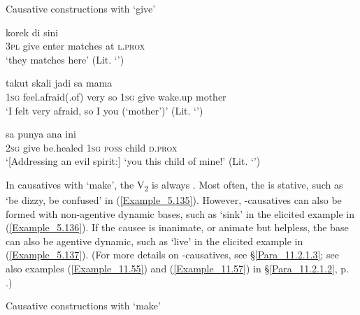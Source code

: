 \begin{styleExampleTitle}
Causative constructions with  ‘give’
\end{styleExampleTitle}

\ea
\label{Example_5.132}
 {} {} {korek} {di} {sini}\\ %
 \textsc{3pl}  give  enter  matches  at  \textsc{l.prox}\\
\glt 
‘they  matches here’ (Lit. ‘’) \textstyleExampleSource{[081025-006-Cv.0180]}
\z

\ea
\label{Example_5.133}
 {takut} {skali} {jadi} {sa} {} {} {mama}\\ %
 \textsc{1sg}  feel.afraid(.of)  very  so  \textsc{1sg}  give  wake.up  mother\\
\glt 
‘I felt very afraid, so I  you (‘mother’)’ (Lit. ‘’) \textstyleExampleSource{[080917-008-NP.0031]}
\z

\ea
\label{Example_5.134}
 {} {} {sa} {punya} {ana} {ini}\\ %
 \textsc{2sg}  give  be.healed  \textsc{1sg}  \textsc{poss}  child  \textsc{d.prox}\\
\glt 
‘[Addressing an evil spirit:] ‘you  this child of mine!’ (Lit. ‘’) \textstyleExampleSource{[081006-023-CvEx.0031]}
\z



In causatives with  ‘make’, the V\textsubscript{2} is always . Most often, the   is stative, such as  ‘be dizzy, be confused’ in (\ref{Example_5.135}). However, -causatives can also be formed with non-agentive dynamic bases, such as  ‘sink’ in the elicited example in (\ref{Example_5.136}). If the causee is inanimate, or animate but helpless, the base can also be agentive dynamic, such as  ‘live’ in the elicited example in (\ref{Example_5.137}). (For more details on -causatives, see §\ref{Para_11.2.1.3}; see also examples (\ref{Example_11.55}) and (\ref{Example_11.57}) in §\ref{Para_11.2.1.2}, p. \pageref{Example_11.55}.)


\begin{styleExampleTitle}
Causative constructions with  ‘make’
\end{styleExampleTitle}

